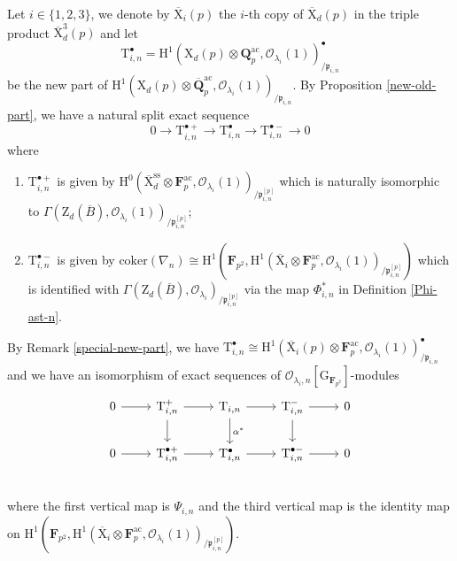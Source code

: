 \documentclass[10pt]{amsart}
\numberwithin{equation}{section}
\theoremstyle{plain}
\numberwithin{equation}{section}
\theoremstyle{definition}
\theoremstyle{remark}
\def\coker{\mathrm{coker}}
\def\ac{\mathrm{ac}}
\def\ss{\mathrm{ss}}
\def\ac{\mathrm{ac}}
\def\calO{\mathcal{O}}
\def\frakp{\mathfrak{p}}
\def\FF{\mathbf{F}}
\def\QQ{\mathbf{Q}}
\def\rmG{\mathrm{G}}
\def\rmH{\mathrm{H}}
\def\rmX{\mathrm{X}}
\def\rmT{\mathrm{T}}
\def\rmZ{\mathrm{Z}}
\begin{document}
Let $i\in\{1, 2, 3\}$, we denote by $\overline{\rmX}_{i}(p)$ the $i$-th copy of $\overline{\rmX}_{d}(p)$ in the triple product $\overline{\rmX}^{3}_{d}(p)$ and let
\begin{equation*}
\rmT^{\bullet}_{i, n}=\rmH^{1}({\rmX}_{d}(p)\otimes{{\QQ}^{\ac}_{p}}, \calO_{\lambda_{i}}(1))^{\bullet}_{/\frakp_{i,n}} 
\end{equation*}
be the new part of $\rmH^{1}({\rmX}_{d}(p)\otimes{\overline{\QQ}^{\ac}_{p}}, \calO_{\lambda_{i}}(1))_{/\frakp_{i,n}}$. By Proposition \ref{new-old-part}, we have a natural split exact sequence
 \begin{equation}\label{fil-T-new}
 0\rightarrow \rmT^{\bullet+}_{i, n}\rightarrow \rmT^{\bullet}_{i, n}\rightarrow \rmT^{\bullet-}_{i, n}\rightarrow 0
 \end{equation}
 where 
 \begin{enumerate}
 \item $\rmT^{\bullet+}_{i, n}$ is given by $\rmH^{0}(\overline{\rmX}^{\ss}_{d}\otimes{\FF^{\ac}_{p}}, \calO_{\lambda_{i}}(1))_{/\frakp^{[p]}_{i,n}}$ which is naturally isomorphic to $\Gamma(\rmZ_{d}(\overline{B}),\calO_{\lambda_{i}}(1))_{/\frakp^{[p]}_{i,n}}$; 
 \item $\rmT^{\bullet-}_{i, n}$ is given by $\coker(\nabla_{n})\cong \rmH^{1}(\FF_{p^{2}},\rmH^{1}(\overline{\rmX}_{i}\otimes{\FF^{\ac}_{p}}, \calO_{\lambda_{i}}(1))_{/\frakp^{[p]}_{i,n}})$ which is identified with $\Gamma(\rmZ_{d}(\overline{B}),\calO_{\lambda_{i}})_{/\frakp^{[p]}_{i, n}}$ via the map $\Phi^{\ast}_{i,n}$ in Definition \ref{Phi-ast-n}. 
 \end{enumerate}
 By Remark \ref{special-new-part}, we have $\rmT^{\bullet}_{i, n}\cong\rmH^{1}(\overline{\rmX}_{i}(p)\otimes{{\FF}^{\ac}_{p}}, \calO_{\lambda_{i}}(1))^{\bullet}_{/\frakp_{i,n}}$ and we have an isomorphism of exact sequences of $\calO_{\lambda_{i}, n}[\rmG_{\FF_{p^{2}}}]$-modules
\begin{equation}\label{comm-T}
\begin{tikzcd}
0 \arrow[r]& \rmT^{+}_{i, n} \arrow[r] \arrow[d]      & \rmT_{i, n}  \arrow[r] \arrow[d, "\alpha^{\ast}"] &  \rmT^{-}_{i, n }\arrow[d] \arrow[r] &0 \\
0 \arrow[r]&\rmT^{\bullet+}_{i, n} \arrow[r] & \rmT^{\bullet}_{i, n}\arrow[r] & \rmT^{\bullet-}_{i, n}\arrow[r] &0\\  
\end{tikzcd}
\end{equation}
where the first vertical map is $\Psi_{i,n}$ and the third vertical map is the identity map on $\rmH^{1}(\FF_{p^{2}},\rmH^{1}(\overline{\rmX}_{i}\otimes{\FF^{\ac}_{p}}, \calO_{\lambda_{i}}(1))_{/\frakp^{[p]}_{i,n}})$. 
\end{document}
